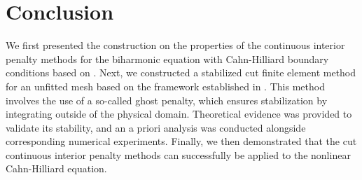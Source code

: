 \documentclass[11pt]{article}
\theoremstyle{remark}
\numberwithin{equation}{section}
\begin{document}
\newpage
\section{Conclusion}%
\label{sec:conclusion}

We first presented the construction on the properties of the continuous interior penalty methods for the biharmonic equation with Cahn-Hilliard boundary conditions based on \cite{feng2007fully, brenner2012}.
Next, we constructed a stabilized cut finite element method for an unfitted mesh based on the framework established in \cite{gurkan2019stabilized}.
This method involves the use of a so-called ghost penalty, which ensures stabilization by integrating
outside of the physical domain.
Theoretical evidence was provided to validate its stability, and an a priori analysis was conducted alongside corresponding numerical experiments.
Finally, we then demonstrated that the cut continuous interior penalty methods can successfully be applied to the nonlinear Cahn-Hilliard equation.


    \printbibliography

    
\end{document}
